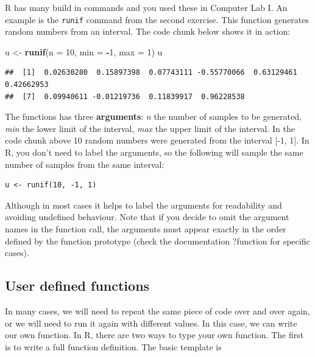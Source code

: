 \documentclass[
]{book}
\newenvironment{Shaded}{\begin{snugshade}}{\end{snugshade}}
\newcommand{\AttributeTok}[1]{\textcolor[rgb]{0.13,0.29,0.53}{#1}}
\newcommand{\DecValTok}[1]{\textcolor[rgb]{0.00,0.00,0.81}{#1}}
\newcommand{\FunctionTok}[1]{\textcolor[rgb]{0.13,0.29,0.53}{\textbf{#1}}}
\newcommand{\NormalTok}[1]{#1}
\newcommand{\OtherTok}[1]{\textcolor[rgb]{0.56,0.35,0.01}{#1}}
\newcommand{\SpecialCharTok}[1]{\textcolor[rgb]{0.81,0.36,0.00}{\textbf{#1}}}
\theoremstyle{definition}
\theoremstyle{definition}
\theoremstyle{definition}
\theoremstyle{definition}
\theoremstyle{remark}
\begin{document}
R has many build in commands and you used these in Computer Lab I. An example is the \texttt{runif} command from the second exercise. This function generates random numbers from an interval. The code chunk below shows it in action:

\begin{Shaded}
\begin{Highlighting}[]
\NormalTok{u }\OtherTok{\textless{}{-}} \FunctionTok{runif}\NormalTok{(}\AttributeTok{n =} \DecValTok{10}\NormalTok{, }\AttributeTok{min =} \SpecialCharTok{{-}}\DecValTok{1}\NormalTok{, }\AttributeTok{max =} \DecValTok{1}\NormalTok{)}
\NormalTok{u}
\end{Highlighting}
\end{Shaded}

\begin{verbatim}
##  [1]  0.02630280  0.15897398  0.07743111 -0.55770066  0.63129461  0.42662953
##  [7]  0.09940611 -0.01219736  0.11839917  0.96228538
\end{verbatim}

The functions has three \textbf{arguments}: \emph{n} the number of samples to be generated, \emph{min} the lower limit of the interval, \emph{max} the upper limit of the interval. In the code chunk above 10 random numbers were generated from the interval {[}-1, 1{]}. In R, you don't need to label the arguments, so the following will sample the same number of samples from the same interval:

\begin{verbatim}
u <- runif(10, -1, 1)
\end{verbatim}

Although in most cases it helps to label the arguments for readability and avoiding undefined behaviour. Note that if you decide to omit the argument names in the function call, the arguments must appear exactly in the order defined by the function prototype (check the documentation ?function for specific cases).

\hypertarget{user-defined-functions}{%
\subsection{User defined functions}\label{user-defined-functions}}

In many cases, we will need to repeat the same piece of code over and over again, or we will need to run it again with different values. In this case, we can write our own function. In R, there are two ways to type your own function. The first is to write a full function definition. The basic template is
\end{document}

